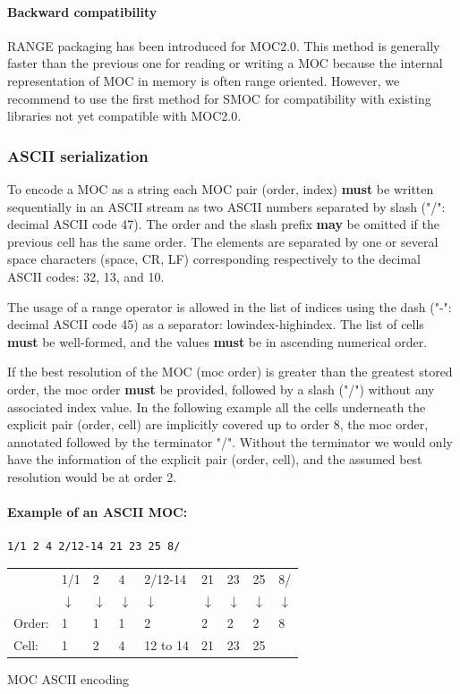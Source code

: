 \documentclass[11pt,a4paper]{ivoa}
\begin{document}
\paragraph{Backward compatibility}
RANGE packaging has been introduced for MOC2.0.
This method is generally faster than the previous one for reading or
writing a MOC because the internal representation of MOC
in memory is often range oriented. However, we recommend to
use the first method for SMOC for compatibility with existing libraries 
not yet compatible with MOC2.0.

\subsubsection{ASCII serialization}
To encode a MOC as a string each MOC pair (order, index) {\bf must} be written
sequentially in an ASCII stream as two ASCII numbers separated
by slash ("/": decimal ASCII code 47). The order and the slash prefix
{\bf may} be omitted if the previous cell has the same order. The
elements are separated by one or several space characters (space, CR,
LF) corresponding respectively to the decimal ASCII codes: 32, 13, and
10.

The usage of a range operator is allowed in the list of indices using the
dash ("-": decimal ASCII code 45) as a separator: lowindex-highindex.
The list of cells {\bf must} be well-formed, and the values {\bf must}
be in ascending numerical order.

If the best resolution of the MOC (moc order) is greater than the
greatest stored order, the moc order {\bf must} be provided, followed
by a slash ("/") without any associated index value.
In the following example all the
cells underneath the explicit pair (order, cell) are implicitly covered
up to order 8, the moc order, annotated followed by the terminator "/".
Without the terminator we would only have the information of the explicit
pair (order, cell), and the assumed best resolution would be at order 2.   


\paragraph{Example of an ASCII MOC:}
\begin{lstlisting}[]
    1/1 2 4 2/12-14 21 23 25 8/
\end{lstlisting}

\begin{center}
  {\small
  \begin{tabular} { l l l l l l l l l }
   & 1/1   & 2  & 4  & 2/12-14 & 21 & 23 &  25 & 8/ \\
   & $\downarrow$ & $\downarrow$ & $\downarrow$ & $\downarrow$ & $\downarrow$ & $\downarrow$ & $\downarrow$ & $\downarrow$ \\
Order:     & 1    & 1 & 1 & 2        & 2  &  2 & 2  & 8 \\
Cell:      & 1    & 2 & 4 & 12 to 14 & 21 & 23 & 25 & \\
\end{tabular}}

MOC ASCII encoding
\end{center}
\end{document}
